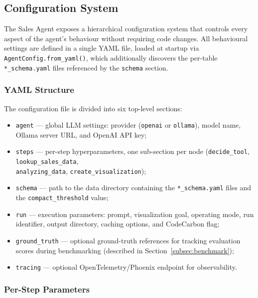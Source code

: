 \subsection{Configuration System}
\label{subsec:config}

The Sales Agent exposes a hierarchical configuration system that controls every
aspect of the agent's behaviour without requiring code changes. All behavioural settings
are defined in a single YAML file, loaded at startup via \texttt{AgentConfig.from\_yaml()},
which additionally discovers the per-table \texttt{*\_schema.yaml} files referenced by the
\texttt{schema} section.

\subsubsection{YAML Structure}

The configuration file is divided into six top-level sections:

\begin{itemize}
    \item \texttt{agent} — global LLM settings: provider (\texttt{openai} or
          \texttt{ollama}), model name, Ollama server URL, and OpenAI API key;
    \item \texttt{steps} — per-step hyperparameters, one sub-section per node
          (\texttt{decide\_tool}, \texttt{lookup\_sales\_data}, \\ \texttt{analyzing\_data},
          \texttt{create\_visualization});
    \item \texttt{schema} — path to the data directory containing the
          \texttt{*\_schema.yaml} files and the \texttt{compact\_threshold} value;
    \item \texttt{run} — execution parameters: prompt, visualization goal, operating
          mode, run identifier, output directory, caching options, and CodeCarbon flag;
    \item \texttt{ground\_truth} — optional ground-truth references for tracking
          evaluation scores during benchmarking (described in
          Section~\ref{subsec:benchmark});
    \item \texttt{tracing} — optional OpenTelemetry/Phoenix endpoint for observability.
\end{itemize}

\subsubsection{Per-Step Parameters}

